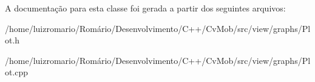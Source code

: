 A documentação para esta classe foi gerada a partir dos seguintes arquivos:\begin{DoxyCompactItemize}
\item 
/home/luizromario/Romário/Desenvolvimento/C++/CvMob/src/view/graphs/Plot.h\item 
/home/luizromario/Romário/Desenvolvimento/C++/CvMob/src/view/graphs/Plot.cpp\end{DoxyCompactItemize}
